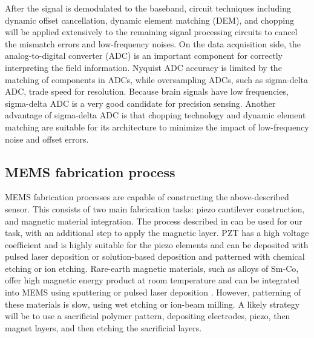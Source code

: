 After the signal is demodulated to the baseband, circuit techniques including dynamic offset cancellation, dynamic element matching (DEM), and chopping will be applied extensively to the remaining signal processing circuits to cancel the mismatch errors and low-frequency noises. On the data acquisition side, the analog-to-digital converter (ADC) is an important component for correctly interpreting the field information. Nyquist ADC accuracy is limited by the matching of components in ADCs, while oversampling ADCs, such as sigma-delta ADC, trade speed for resolution. Because brain signals have low frequencies, sigma-delta ADC is a very good candidate for precision sensing. Another advantage of sigma-delta ADC is that chopping technology and dynamic element matching are suitable for its architecture to minimize the impact of low-frequency noise and offset errors.


\subsection{MEMS fabrication process}

MEMS fabrication processes are capable of constructing the above-described sensor. This consists of two main fabrication tasks: piezo cantilever construction, and magnetic material integration. The process described in \cite{shen2008design} can be used for our task, with an additional step to apply the magnetic layer. PZT has a high voltage coefficient and is highly suitable for the piezo elements \cite{tadigadapa2009piezoelectric} and can be deposited with pulsed laser deposition or solution-based deposition and patterned with chemical etching or ion etching. Rare-earth magnetic materials, such as alloys of Sm-Co, offer high magnetic energy product at room temperature and can be integrated into MEMS using sputtering or pulsed laser deposition \cite{arnold2009permanent}. However, patterning of these materials is slow, using wet etching or ion-beam milling. A likely strategy will be to use a sacrificial polymer pattern, depositing electrodes, piezo, then magnet layers, and then etching the sacrificial layers. 

